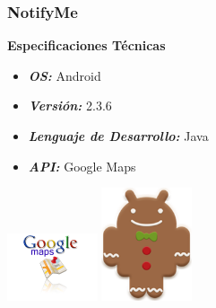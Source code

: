 \documentclass[9pt]{beamer}
\begin{document}
	\begin{frame}
		\frametitle{NotifyMe}
			\begin{block}{\textbf{Especificaciones Técnicas}}
				\begin{itemize}
					\item \emph{\textbf{OS:}} Android
					\item \emph{\textbf{Versión:}} 2.3.6
					\item \emph{\textbf{Lenguaje de Desarrollo:}} Java				
					\item \emph{\textbf{API:}} Google Maps
				\end{itemize}
				\begin{center}
					\includegraphics[width=0.20\textwidth]{gmaps.png}
					\includegraphics[width=0.20\textwidth]{gingerbread.png}
				\end{center}
			\end{block}
	\end{frame}
\end{document}
